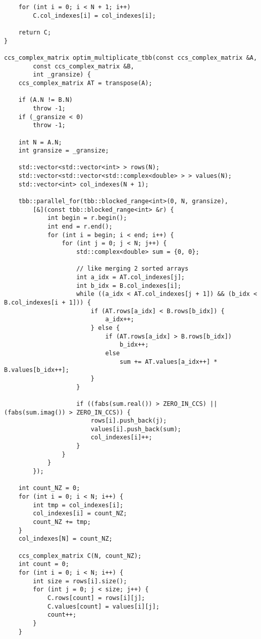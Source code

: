 \documentclass{report}
\begin{document}
\begin{itemize}
\begin{itemize}
\begin{lstlisting}
    for (int i = 0; i < N + 1; i++)
        C.col_indexes[i] = col_indexes[i];

    return C;
}

ccs_complex_matrix optim_multiplicate_tbb(const ccs_complex_matrix &A,
        const ccs_complex_matrix &B,
        int _gransize) {
    ccs_complex_matrix AT = transpose(A);

    if (A.N != B.N)
        throw -1;
    if (_gransize < 0)
        throw -1;

    int N = A.N;
    int gransize = _gransize;

    std::vector<std::vector<int> > rows(N);
    std::vector<std::vector<std::complex<double> > > values(N);
    std::vector<int> col_indexes(N + 1);

    tbb::parallel_for(tbb::blocked_range<int>(0, N, gransize),
        [&](const tbb::blocked_range<int> &r) {
            int begin = r.begin();
            int end = r.end();
            for (int i = begin; i < end; i++) {
                for (int j = 0; j < N; j++) {
                    std::complex<double> sum = {0, 0};

                    // like merging 2 sorted arrays
                    int a_idx = AT.col_indexes[j];
                    int b_idx = B.col_indexes[i];
                    while ((a_idx < AT.col_indexes[j + 1]) && (b_idx < B.col_indexes[i + 1])) {
                        if (AT.rows[a_idx] < B.rows[b_idx]) {
                            a_idx++;
                        } else {
                            if (AT.rows[a_idx] > B.rows[b_idx])
                                b_idx++;
                            else
                                sum += AT.values[a_idx++] * B.values[b_idx++];
                        }
                    }

                    if ((fabs(sum.real()) > ZERO_IN_CCS) || (fabs(sum.imag()) > ZERO_IN_CCS)) {
                        rows[i].push_back(j);
                        values[i].push_back(sum);
                        col_indexes[i]++;
                    }
                }
            }
        });

    int count_NZ = 0;
    for (int i = 0; i < N; i++) {
        int tmp = col_indexes[i];
        col_indexes[i] = count_NZ;
        count_NZ += tmp;
    }
    col_indexes[N] = count_NZ;

    ccs_complex_matrix C(N, count_NZ);
    int count = 0;
    for (int i = 0; i < N; i++) {
        int size = rows[i].size();
        for (int j = 0; j < size; j++) {
            C.rows[count] = rows[i][j];
            C.values[count] = values[i][j];
            count++;
        }
    }


\end{lstlisting}
\end{itemize}
\end{itemize}
\end{document}
